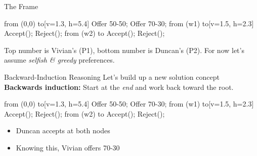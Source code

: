\begin{frame}{The Frame}
\centering
\begin{gametree}[player names={Vivian, Duncan}, scale=0.85]
  \branch[player=1, root=w, label=90] from (0,0) to[v=1.3, h=5.4]
    {Offer 50-50; Offer 70-30};
  \branch[player=2, label=135] from (w1) to[v=1.5, h=2.3]
    {Accept();
     Reject()};
  \branch[label=45] from (w2) to
    {Accept();
     Reject()};
\end{gametree}
\bsk
\raggedright
{\footnotesize Top number is Vivian's (P1), bottom number is Duncan's (P2).}
\bsk
For now let's assume \textit{selfish \& greedy} preferences.
\end{frame}

\begin{frame}{Backward-Induction Reasoning}
Let's build up a new solution concept\\
\textbf{Backwards induction:} Start at the \textit{end} and work back toward the root.
\bsk
\begin{center}
    \begin{gametree}[player names={Vivian, Duncan}, scale=0.85]
  \branch[player=1, root=w, label=90] from (0,0) to[v=1.3, h=5.4]
    {Offer 50-50; Offer 70-30};
  \branch[player=2, label=135] from (w1) to[v=1.5, h=2.3]
    {Accept();
     Reject()};
  \branch[label=45] from (w2) to
    {Accept();
     Reject()};
\end{gametree}
\end{center}
\begin{itemize}
    \item<2-> Duncan accepts at both nodes
    \item<3-> Knowing this, Vivian offers 70-30
\end{itemize}
\end{frame}

